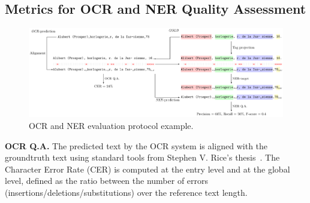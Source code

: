 %
%
%






\subsection{Metrics for OCR and NER Quality Assessment}

\begin{figure}[tb]
    \includegraphics[width=\linewidth]{figs/eval-ocr-ner.pdf}
    \caption{OCR and NER evaluation protocol example.}
    \label{fig.eval-ocr-ner}
\end{figure}

\textbf{OCR Q.A.}  The predicted text by the OCR system is aligned with the groundtruth text using standard tools from
Stephen V. Rice's thesis~\cite{santos.2019.wcmel,neudecker.2021.whdip}. The Character Error Rate (CER) is computed at
the entry level and at the global level, defined as the ratio between the number of errors
(insertions/deletions/substitutions) over the reference text length. 

